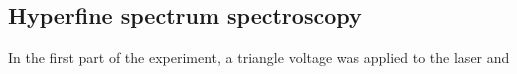 \documentclass{article}
\begin{document}
\subsection{Hyperfine spectrum spectroscopy}
In the first part of the experiment, a triangle voltage was applied to the laser and
\end{document}
